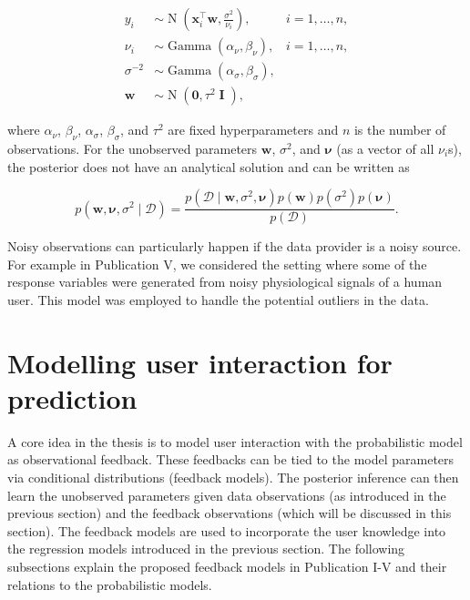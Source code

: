 \documentclass[dissertation,math,vertlayout,pdfa,colorlinks]{aaltoseries}
\newcommand{\bw}{\bm{w}}
\newcommand{\bD}{\mathcal{D}}
\DeclareMathOperator{\eye}{\textbf{I}}
\DeclareMathOperator{\normalpdf}{N}
\DeclareMathOperator{\gammapdf}{Gamma}
\newcommand{\tp}{^{\top}}
\begin{document}
	
\begin{align}\label{Eq:ard_Bayesian_regression}
y_i &\sim \normalpdf(\bm{x}_i\tp\bw,\frac{\sigma^2}{\nu_i}),  & i=1,\ldots,n,\\
\nu_i &\sim \gammapdf(\alpha_{\nu}, \beta_{\nu}), & i=1,\ldots,n,\nonumber \\
\sigma^{-2} &\sim \gammapdf(\alpha_{\sigma}, \beta_{\sigma}), \nonumber \\
\bw &\sim \normalpdf(\textbf{0},\tau^2 \eye), \nonumber
\end{align}

\noindent where $\alpha_{\nu}$, $\beta_{\nu}$, $\alpha_{\sigma}$, $\beta_{\sigma}$, and $\tau^2$ are fixed hyperparameters and $n$ is the number of observations. For the unobserved parameters $\bw$, $\sigma^2$, and $\bm{\nu}$ (as a vector of all $\nu_i$s), the posterior does not have an analytical solution and can be written as

\begin{equation}\label{Eq:Bayes_rule_ARD}
p(\bw, \bm{\nu}, \sigma^2 \mid \bD) = \frac{p(\bD \mid \bw, \sigma^2, \bm{\nu})p(\bw)p(\sigma^2)p(\bm{\nu})}{p(\bD)}.
\end{equation} 

Noisy observations can particularly happen if the data provider is a noisy source. For example in Publication V, we considered the setting where some of the response variables were generated from noisy physiological signals of a human user. This model was employed to handle the potential outliers in the data. 



\section{Modelling user interaction for prediction}\label{prob_model_user}

A core idea in the thesis is to model user interaction with the probabilistic model as observational feedback. These feedbacks can be tied to the model parameters via conditional distributions (feedback models). The posterior inference can then learn the unobserved parameters given data observations (as introduced in the previous section) and the feedback observations (which will be discussed in this section). The feedback models are used to incorporate the user knowledge into the regression models introduced in the previous section. The following subsections explain the proposed feedback models in Publication I-V and their relations to the probabilistic models.
\end{document}
